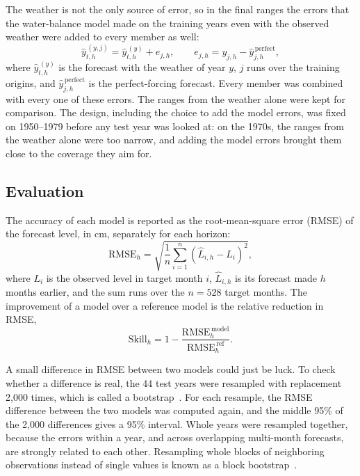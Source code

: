 \documentclass{article}
\begin{document}
The weather is not the only source of error, so in the final ranges the errors that the
water-balance model made on the training years even with the observed weather were added to
every member as well:
\begin{equation}
\hat y^{\,(y,j)}_{t,h} = \hat y^{\,(y)}_{t,h} + e_{j,h}, \qquad
e_{j,h} = y_{j,h} - \hat y^{\,\mathrm{perfect}}_{j,h}, \label{eq:modelerror}
\end{equation}
where $\hat y^{\,(y)}_{t,h}$ is the forecast with the weather of year $y$, $j$ runs over the
training origins, and $\hat y^{\,\mathrm{perfect}}_{j,h}$ is the perfect-forcing forecast. Every
member was combined with every one of these errors. The ranges from the weather alone were kept
for comparison. The design, including the choice to add the model errors, was fixed on
1950--1979 before any test year was looked at: on the 1970s, the ranges from the weather alone
were too narrow, and adding the model errors brought them close to the coverage they aim for.

\subsection{Evaluation}

The accuracy of each model is reported as the root-mean-square error (RMSE) of the forecast
level, in cm, separately for each horizon:
\begin{equation}
\mathrm{RMSE}_h = \sqrt{\frac{1}{n} \sum_{i=1}^{n} \left(\hat L_{i,h} - L_i\right)^2},
\label{eq:rmse}
\end{equation}
where $L_i$ is the observed level in target month $i$, $\hat L_{i,h}$ is its forecast made $h$
months earlier, and the sum runs over the $n = 528$ target months. The improvement of a model
over a reference model is the relative reduction in RMSE,
\begin{equation}
\mathrm{Skill}_h = 1 - \frac{\mathrm{RMSE}^{\,\mathrm{model}}_h}{\mathrm{RMSE}^{\,\mathrm{ref}}_h}.
\label{eq:skill}
\end{equation}

A small difference in RMSE between two models could just be luck. To check whether a difference
is real, the 44 test years were resampled with replacement 2,000 times, which is called a
bootstrap~\cite{efron1994}. For each resample, the RMSE difference between the two models was
computed again, and the middle 95\% of the 2,000 differences gives a 95\% interval. Whole years
were resampled together, because the errors within a year, and across overlapping multi-month
forecasts, are strongly related to each other. Resampling whole blocks of neighboring
observations instead of single values is known as a block bootstrap~\cite{kunsch1989}.
\end{document}
